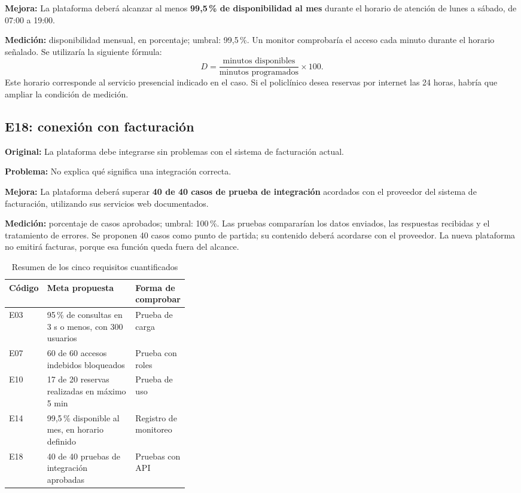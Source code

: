 \documentclass[conference,onecolumn]{IEEEtran}
\begin{document}
\textbf{Mejora:} La plataforma deberá alcanzar al menos \textbf{99,5\,\% de disponibilidad al mes} durante el horario de atención de lunes a sábado, de 07:00 a 19:00.

\textbf{Medición:} disponibilidad mensual, en porcentaje; umbral: 99,5\,\%. Un monitor comprobaría el acceso cada minuto durante el horario señalado. Se utilizaría la siguiente fórmula:
\begin{equation}
D=\frac{\text{minutos disponibles}}{\text{minutos programados}}\times100.
\end{equation}
Este horario corresponde al servicio presencial indicado en el caso. Si el policlínico desea reservas por internet las 24 horas, habría que ampliar la condición de medición.

\subsection{E18: conexión con facturación}
\textbf{Original:} La plataforma debe integrarse sin problemas con el sistema de facturación actual.

\textbf{Problema:} No explica qué significa una integración correcta.

\textbf{Mejora:} La plataforma deberá superar \textbf{40 de 40 casos de prueba de integración} acordados con el proveedor del sistema de facturación, utilizando sus servicios web documentados.

\textbf{Medición:} porcentaje de casos aprobados; umbral: 100\,\%. Las pruebas compararían los datos enviados, las respuestas recibidas y el tratamiento de errores. Se proponen 40 casos como punto de partida; su contenido deberá acordarse con el proveedor. La nueva plataforma no emitirá facturas, porque esa función queda fuera del alcance.

\begin{table}[H]
\caption{Resumen de los cinco requisitos cuantificados}
\label{tab:metricas}
\centering\footnotesize
\begin{tabularx}{\linewidth}{@{}p{0.08\linewidth}Yp{0.27\linewidth}@{}}
\toprule
\textbf{Código} & \textbf{Meta propuesta} & \textbf{Forma de comprobar} \\
\midrule
E03 & 95\,\% de consultas en 3 s o menos, con 300 usuarios & Prueba de carga \\
E07 & 60 de 60 accesos indebidos bloqueados & Prueba con roles \\
E10 & 17 de 20 reservas realizadas en máximo 5 min & Prueba de uso \\
E14 & 99,5\,\% disponible al mes, en horario definido & Registro de monitoreo \\
E18 & 40 de 40 pruebas de integración aprobadas & Pruebas con API \\
\bottomrule
\end{tabularx}
\end{table}
\end{document}
